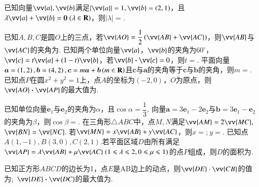 \documentclass{BHCexam}
\newcommand{\xl}[2]{\vv{#1}\bm\cdot\vv{#2}}
\begin{document}
\begin{questions}
\vspace{-2em}
\begin{center}
\end{center}
\qs
已知向量$ \vv{a},\vv{b} $满足$ |\vv{a} |=1,\vv{b}=(2,1)$，且$ \lambda \vv{a}+\vv{b}=\bm{0}~(\lambda\in\mathbf{R}) $，则$ |\lambda |= $\tk.


\question
已知$A,B,C$是圆$O$上的三点，若$\vv{AO}=\dfrac{1}{2}\left(\vv{AB}+\vv{AC}\right)$，则$\vv{AB}$与$\vv{AC}$的夹角为\tk.
\qs 已知两个单位向量$\vv{a}$，$\vv{b}$的夹角为$60^{\circ}$，$\vv{c}=t\vv{a}+(1-t)\vv{b}$，若$\xl{b}{c}=0$，则$t=$\tk.
\qs 平面向量$\bm{a}=\left(1,2\right),\bm{b}=\left(4,2\right),\bm{c}=m\bm{a}+\bm{b}\left(m\in\mathbf{R}\right) $且$\bm{c} $与$ \bm{a} $的夹角等于$ \bm{c} $与$ \bm{b} $的夹角，则$ m= $\tk.
\qs 已知点$ P $在圆$ x^2+y^2=1 $上，点$ A $的坐标为$ (-2,0) $，$ O $为原点，则$ \vv{AO}\bm{\cdot}\vv{AP} $的最大值为\tk.

\qs 已知单位向量$ \bm{e}_1\text{与}\bm{e}_2 $的夹角为$ \alpha $，且$ \cos \alpha =\dfrac{1}{3},~$向量$ \bm{a}=3\bm{e}_1-2\bm{e}_2 $与$ \bm{b}=3\bm{e}_1-\bm{e}_2 $的夹角为$ \beta $，则$ \cos \beta =$\tk.
\qs 在三角形$\triangle ABC$中，点$ M,N $满足$ \vv{AM}=2\vv{MC} ,~$$ \vv{BN}=\vv{NC} .~$若$ \vv{MN}=x\vv{AB}+y\vv{AC} $，则$ x= $\tk;$~ y= $\tk.
\qs 已知点$ A(1,-1) ,B(3,0),C(2,1).$若平面区域$ D $由所有满足$ \vv{AP}=\lambda \vv{AB}+\mu \vv{AC}~(1\le \lambda \le 2,0\le \mu \le 1) $的点$ P $组成，则$ D $的面积为\tk.

\qs 已知正方形$ ABCD $的边长为1，点$ E $是AB边上的动点，则$ \vv{DE}\cdot \vv{CB} $的值为\tk;~$ \vv{DE}\bm\cdot \vv{DC} $的最大值为\tk.


\end{questions}
\end{document}

